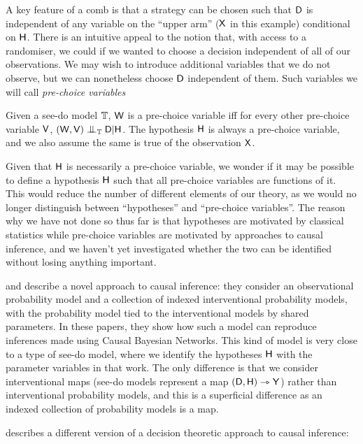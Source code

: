 A key feature of a comb is that a strategy can be chosen such that $\mathsf{D}$ is independent of any variable on the ``upper arm'' ($\mathsf{X}$ in this example) conditional on $\mathsf{H}$. There is an intuitive appeal to the notion that, with access to a randomiser, we could if we wanted to choose a decision independent of all of our observations. We may wish to introduce additional variables that we do not observe, but we can nonetheless choose $\mathsf{D}$ independent of them. Such variables we will call \emph{pre-choice variables}

\begin{definition}
Given a see-do model $\mathbb{T}$, $\mathsf{W}$ is a pre-choice variable iff for every other pre-choice variable $\mathsf{V}$, $(\RV{W},\RV{V})\CI_{\model{T}} \RV{D}|\RV{H}$. The hypothesis $\mathsf{H}$ is always a pre-choice variable, and we also assume the same is true of the observation $\mathsf{X}$.
\end{definition}

Given that $\mathsf{H}$ is necessarily a pre-choice variable, we wonder if it may be possible to define a hypothesis $\mathsf{H}$ such that all pre-choice variables are functions of it. This would reduce the number of different elements of our theory, as we would no longer distinguish between ``hypotheses'' and ``pre-choice variables''. The reason why we have not done so thus far is that hypotheses are motivated by classical statistics while pre-choice variables are motivated by approaches to causal inference, and we haven't yet investigated whether the two can be identified without losing anything important.

\citet{lattimore_causal_2019} and \citet{lattimore_replacing_2019} describe a novel approach to causal inference: they consider an observational probability model and a collection of indexed interventional probability models, with the probability model tied to the interventional models by shared parameters. In these papers, they show how such a model can reproduce inferences made using Causal Bayesian Networks. This kind of model is very close to a type of see-do model, where we identify the hypotheses $\mathsf{H}$ with the parameter variables in that work. The only difference is that we consider interventional maps (see-do models represent a map $(\mathsf{D},\mathsf{H})\rightarrowtriangle \mathsf{Y}$) rather than interventional probability models, and this is a superficial difference as an indexed collection of probability models is a map.

\citet{dawid_decision-theoretic_2020} describes a different version of a decision theoretic approach to causal inference:

